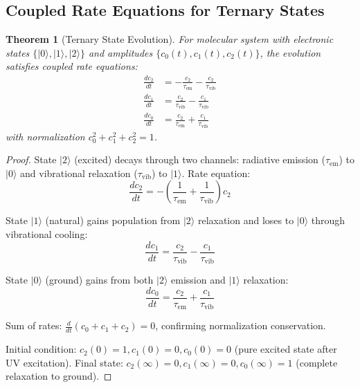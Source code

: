 \documentclass[twocolumn,10pt]{article}
\newtheorem{theorem}{Theorem}[section]
\begin{document}
\subsection{Coupled Rate Equations for Ternary States}

\begin{theorem}[Ternary State Evolution]
\label{thm:ternary_evolution}
For molecular system with electronic states $\{|0\rangle, |1\rangle, |2\rangle\}$ and amplitudes $\{c_0(t), c_1(t), c_2(t)\}$, the evolution satisfies coupled rate equations:
\begin{align}
\frac{dc_2}{dt} &= -\frac{c_2}{\tau_{\text{em}}} - \frac{c_2}{\tau_{\text{vib}}} \\
\frac{dc_1}{dt} &= \frac{c_2}{\tau_{\text{vib}}} - \frac{c_1}{\tau_{\text{vib}}} \\
\frac{dc_0}{dt} &= \frac{c_2}{\tau_{\text{em}}} + \frac{c_1}{\tau_{\text{vib}}}
\end{align}
with normalization $c_0^2 + c_1^2 + c_2^2 = 1$.
\end{theorem}

\begin{proof}
State $|2\rangle$ (excited) decays through two channels: radiative emission ($\tau_{\text{em}}$) to $|0\rangle$ and vibrational relaxation ($\tau_{\text{vib}}$) to $|1\rangle$. Rate equation:
\begin{equation}
\frac{dc_2}{dt} = -\left(\frac{1}{\tau_{\text{em}}} + \frac{1}{\tau_{\text{vib}}}\right) c_2
\end{equation}

State $|1\rangle$ (natural) gains population from $|2\rangle$ relaxation and loses to $|0\rangle$ through vibrational cooling:
\begin{equation}
\frac{dc_1}{dt} = \frac{c_2}{\tau_{\text{vib}}} - \frac{c_1}{\tau_{\text{vib}}}
\end{equation}

State $|0\rangle$ (ground) gains from both $|2\rangle$ emission and $|1\rangle$ relaxation:
\begin{equation}
\frac{dc_0}{dt} = \frac{c_2}{\tau_{\text{em}}} + \frac{c_1}{\tau_{\text{vib}}}
\end{equation}

Sum of rates: $\frac{d}{dt}(c_0 + c_1 + c_2) = 0$, confirming normalization conservation.

Initial condition: $c_2(0) = 1, c_1(0) = 0, c_0(0) = 0$ (pure excited state after UV excitation).
Final state: $c_2(\infty) = 0, c_1(\infty) = 0, c_0(\infty) = 1$ (complete relaxation to ground).
\end{proof}
\end{document}
